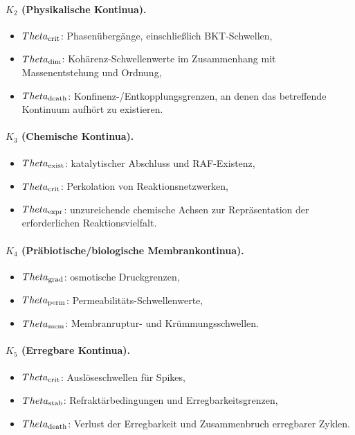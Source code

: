 \paragraph{\texorpdfstring{\(K_2\)}{K_2} (Physikalische Kontinua).}
\begin{itemize}
    \item \(\Theta_{\rm crit}\): Phasenübergänge, einschließlich BKT-Schwellen,
    \item \(\Theta_{\rm dim}\): Kohärenz-Schwellenwerte im Zusammenhang mit
          Massenentstehung und Ordnung,
    \item \(\Theta_{\rm death}\): Konfinenz-/Entkopplungsgrenzen, an denen das
          betreffende Kontinuum aufhört zu existieren.
\end{itemize}

\paragraph{\texorpdfstring{\(K_3\)}{K_3} (Chemische Kontinua).}
\begin{itemize}
    \item \(\Theta_{\rm exist}\): katalytischer Abschluss und RAF-Existenz,
    \item \(\Theta_{\rm crit}\): Perkolation von Reaktionsnetzwerken,
    \item \(\Theta_{\rm expr}\): unzureichende chemische Achsen zur Repräsentation der erforderlichen
          Reaktionsvielfalt.
\end{itemize}

\paragraph{\texorpdfstring{\(K_4\)}{K_4} (Präbiotische/biologische Membrankontinua).}
\begin{itemize}
    \item \(\Theta_{\rm grad}\): osmotische Druckgrenzen,
    \item \(\Theta_{\rm perm}\): Permeabilitäts-Schwellenwerte,
    \item \(\Theta_{\rm mem}\): Membranruptur- und Krümmungsschwellen.
\end{itemize}

\paragraph{\texorpdfstring{\(K_5\)}{K_5} (Erregbare Kontinua).}
\begin{itemize}
    \item \(\Theta_{\rm crit}\): Auslöseschwellen für Spikes,
    \item \(\Theta_{\rm stab}\): Refraktärbedingungen und Erregbarkeitsgrenzen,
    \item \(\Theta_{\rm death}\): Verlust der Erregbarkeit und Zusammenbruch erregbarer Zyklen.
\end{itemize}

